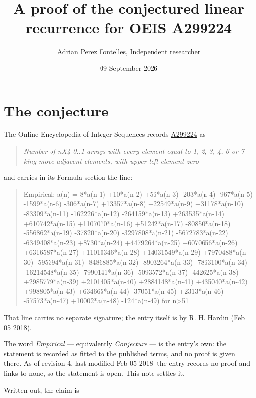\documentclass[11pt]{article}
\title{A proof of the conjectured linear recurrence for OEIS A299224}
\author{Adrian Perez Fontelles, Independent researcher}
\date{09 September 2026}
\theoremstyle{definition}
\begin{document}
\maketitle
\section{The conjecture}

The Online Encyclopedia of Integer Sequences records \href{https://oeis.org/A299224}{A299224} as

\begin{quote}\itshape Number of nX4 0..1 arrays with every element equal to 1, 2, 3, 4, 6 or 7 king-move adjacent elements, with upper left element zero\end{quote}

and carries in its Formula section the line:

\begin{quote}\ttfamily Empirical: a(n) = 8*a(n-1) +10*a(n-2) +56*a(n-3) -203*a(n-4) -967*a(n-5) -1599*a(n-6) -306*a(n-7) +13357*a(n-8) +22549*a(n-9) +31178*a(n-10) -83309*a(n-11) -162226*a(n-12) -264159*a(n-13) +263535*a(n-14) +610742*a(n-15) +1107070*a(n-16) +51242*a(n-17) -80850*a(n-18) -556862*a(n-19) -37820*a(n-20) -3297808*a(n-21) -5672783*a(n-22) -6349408*a(n-23) +8730*a(n-24) +4479264*a(n-25) +6070656*a(n-26) +6316587*a(n-27) +11010346*a(n-28) +14031549*a(n-29) +7970488*a(n-30) -595394*a(n-31) -8486885*a(n-32) -8903264*a(n-33) -7863100*a(n-34) -16214548*a(n-35) -7990141*a(n-36) -5093572*a(n-37) -442625*a(n-38) +2985779*a(n-39) +2101405*a(n-40) +2884148*a(n-41) +435040*a(n-42) +998805*a(n-43) +634665*a(n-44) -37051*a(n-45) +2313*a(n-46) -57573*a(n-47) +10002*a(n-48) -124*a(n-49) for n>51\end{quote}

That line carries no separate signature; the entry itself is by R. H. Hardin (Feb 05 2018).

The word {\itshape Empirical} --- equivalently {\itshape Conjecture} --- is the entry's own: the statement is recorded as fitted to the published terms, and no proof is given there. As of revision 4, last modified Feb 05 2018, the entry records no proof and links to none, so the statement is open. This note settles it.

Written out, the claim is
\end{document}

